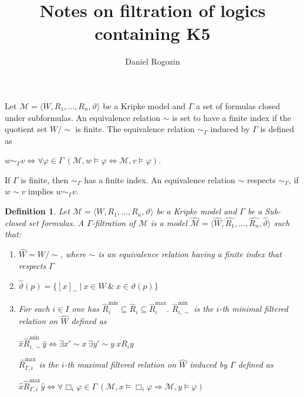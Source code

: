 \documentclass[a4paper]{article}
\author{Daniel Rogozin}
\date{}
\title{Notes on filtration of logics containing {\bf K5}}
\theoremstyle{defin}
\newtheorem{defin}{Definition}
\theoremstyle{theorem}
\theoremstyle{prop}
\theoremstyle{lemma}
\theoremstyle{fact}
\theoremstyle{ex}
\theoremstyle{col}
\begin{document}
\maketitle

Let $\mathcal{M} = \langle W, R_1, \dots, R_n, \vartheta \rangle$ be a Kripke model and $\Gamma$ a set of formulas closed under subformulas. An equivalence relation $\sim$ is set to have a finite index if the quotient set $W / \sim$ is finite. The equivalence relation $\sim_{\Gamma}$ induced by $\Gamma$ is defined as

\begin{center}
  $w \sim_{\Gamma} v \Leftrightarrow \forall \varphi \in \Gamma \: (\mathcal{M}, w \models \varphi \Leftrightarrow \mathcal{M}, v \models \varphi)$.
\end{center}

If $\Gamma$ is finite, then $\sim_{\Gamma}$ has a finite index. An equivalence relation $\sim$ respects $\sim_{\Gamma}$, if $w \sim v$ implies $w \sim_{\Gamma} v$.

\begin{defin}
  Let $\mathcal{M} = \langle W, R_1, \dots, R_n, \vartheta \rangle$ be a Kripke model and $\Gamma$ be a Sub-closed set formulas. A $\Gamma$-filtration of $\mathcal{M}$ is a model
  $\widehat{\mathcal{M}} = \langle \widehat{W}, \widehat{R_1}, \dots, \widehat{R_n}, \widehat{\vartheta} \rangle$ such that:
  \begin{enumerate}
    \item $\widehat{W} = W / \sim$, where $\sim$ is an equivalence relation having a finite index that respects $\Gamma$
    \item $\widehat{\vartheta}(p) = \{ [x]_{\sim} \: | \: x \in W \: \& \: x \in \vartheta(p)\}$
    \item For each $i \in I$ one has $\widehat{R}_i^{\text{min}} \subseteq \widehat{R}_i \subseteq \widehat{R}_i^{\text{max}}$. $\widehat{R}_{i, \sim}^{\text{min}}$ is the $i$-th minimal filtered relation on $\widehat{W}$ defined as
    \begin{center}
      $\hat{x} \widehat{R}_{i, \sim}^{\text{min}} \hat{y} \Leftrightarrow \exists x' \sim x \: \exists y' \sim y \: x R_i y$
    \end{center}
    $\widehat{R}_{\Gamma,i}^{\text{max}}$ is the $i$-th maximal filtered relation on $\widehat{W}$ induced by $\Gamma$ defined as
    \begin{center}
      $\hat{x} \widehat{R}_{\Gamma,i}^{\text{max}} \hat{y} \Leftrightarrow \forall \Box_i \varphi \in \Gamma \: (\mathcal{M}, x \models \Box_i \varphi \Rightarrow \mathcal{M}, y \models \varphi)$
    \end{center}
  \end{enumerate}
\end{defin}
\end{document}
